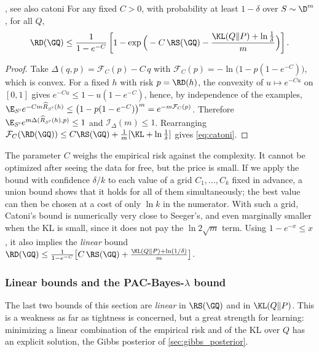 \begin{corollary}{\citet{catoni2007pac}, see also \citet{germain2009pac}}{catoni}
For any fixed $C>0$, with probability at least $1-\delta$ over $S\sim\D^m$, for all $Q$,
\begin{equation}\label{eq:catoni}
\RD(\GQ)\leq\frac{1}{1-e^{-C}}\left[1-\exp\Big(-C\,\RS(\GQ)-\frac{\KL(Q\|P)+\ln\frac1\delta}{m}\Big)\right].
\end{equation}
\end{corollary}
\begin{proof}
Take $\Delta(q,p)=\mathcal F_C(p)-C\,q$ with $\mathcal F_C(p)=-\ln\big(1-p(1-e^{-C})\big)$,
which is convex. For a fixed $h$ with risk $p=\RD(h)$, the convexity of
$u\mapsto e^{-Cu}$ on $[0,1]$ gives $e^{-Cu}\leq1-u(1-e^{-C})$, hence, by
independence of the examples, $\E_{S'}e^{-Cm\widehat R_{S'}(h)}\leq\big(1-p(1-e^{-C})\big)^m=e^{-m\mathcal F_C(p)}$.
Therefore $\E_{S'}e^{m\Delta(\widehat R_{S'}(h),p)}\leq1$ and $\mathcal I_\Delta(m)\leq1$.
Rearranging $\mathcal F_C(\RD(\GQ))\leq C\RS(\GQ)+\frac1m[\KL+\ln\frac1\delta]$ gives \eqref{eq:catoni}.
\end{proof}

The parameter $C$ weighs the empirical risk against the complexity. It cannot be
optimized after seeing the data for free, but the price is small. If we apply
the bound with confidence $\delta/k$ to each value of a grid $C_1,\dots,C_k$
fixed in advance, a union bound shows that it holds for all of them
simultaneously; the best value can then be chosen at a cost of only $\ln k$ in
the numerator. With such a grid, Catoni's bound is numerically very
close to Seeger's, and even marginally smaller when the KL is small, since it
does not pay the $\ln 2\sqrt m$ term. Using $1-e^{-x}\leq x$, it also implies
the \emph{linear} bound
$\RD(\GQ)\leq\frac{1}{1-e^{-C}}\big[C\,\RS(\GQ)+\frac{\KL(Q\|P)+\ln(1/\delta)}{m}\big]$.

\subsubsection{Linear bounds and the PAC-Bayes-\texorpdfstring{$\lambda$}{lambda} bound}

The last two bounds of this section are \emph{linear} in $\RS(\GQ)$ and in
$\KL(Q\|P)$. This is a weakness as far as tightness is concerned, but a great
strength for learning: minimizing a linear combination of the empirical risk and
of the KL over $Q$ has an explicit solution, the Gibbs posterior of
\cref{sec:gibbs_posterior}.

